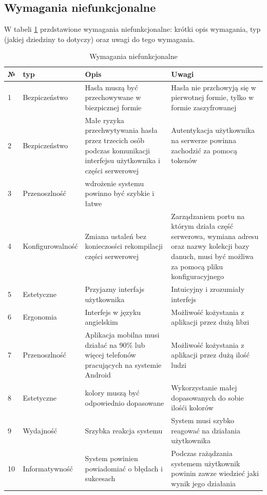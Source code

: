 \subsection{Wymagania niefunkcjonalne}
W tabeli \ref{tab:wymaganianiefunkcjonalne} przdstawione wymagania niefunkcjonalne: krótki opis wymagania, typ (jakiej dziedziny to dotyczy) oraz uwagi do tego wymagania.
\begin{table}[htb] \small
    \caption{Wymagania niefunkcjonalne}
    \label{tab:wymaganianiefunkcjonalne}
    \begin{tabular}{| m{0.5cm} | m{3cm} | m{5.75cm} | m{5.75cm} |} 
    \hline
    № & typ & Opis & Uwagi \\
    \hline
    1 & Bezpiczeństwo & Hasła muszą być przechowywane w biezpicznej formie & Hasła nie przchowyją się w pierwotnej formie, tylko w formie zaszyfrowanej \\ 
    \hline
    2 & Bezpiczeństwo & Małe ryzyka przechwytywania hasła przez trzecich osób podczas komunikacji interfejsu użytkownika i części serwerowej & Autentykacja użytkownika na serwerze powinna zachodzić za pomocą tokenów \\ 
    \hline
    3 & Przenoszlność & wdrożenie systemu powinno być szybkie i łatwe & \\ 
    \hline
    4 & Konfigurowalność & Zmiana ustaleń bez konieczosści rekompilacji części serwerowej & Zarządzaniem portu na którym działa część serwerowa, wymiana adresu oraz nazwy kolekcji bazy danuch, musi być możliwa za pomocą pliku konfiguracyjnego \\ 
    \hline
    5 & Estetyczne & Przyjazny interfajs użytkownika & Intuicyjny i zrozumiały interfejs \\ 
    \hline
    6 & Ergonomia & Interfejs w języku angielskim & Możliwość kożystania z aplikacji przez dużą libzi \\
    \hline
    7 & Przenoszlność & Aplikacja mobilna musi działać na 90\% lub więcej telefonów pracujących na systemie Android & Możliwość kożystania z aplikacji przez dużą ilość ludzi \\
    \hline
    8 & Estetyczne & kolory muszą być odpowiednio dopasowane & Wykorzystanie małej dopasowanych do sobie ilośći kolorów  \\
    \hline
    9 & Wydajność & Srzybka reakcja systemu & System musi szybko reagować na działania użytkownika \\
    \hline
    10 & Informatywność & System powinien powiadomiać o błędach i sukcesach  & Podczas rażądzania systemem użytkownik powinin zawze wiedzieć jaki wynik jego działania \\

\end{tabular}
\end{table}
